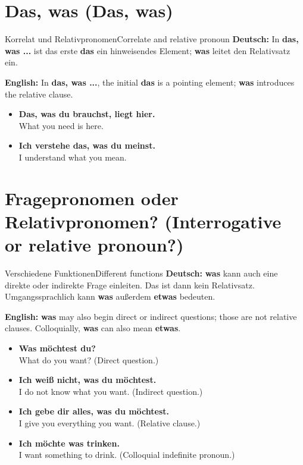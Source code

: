 \documentclass[a4paper,11pt]{article}
\newcommand{\GermanText}[1]{\textbf{Deutsch: }#1\par}
\newcommand{\EnglishText}[1]{{\small\color{SoftGray}\textbf{English: }#1\par}}
\newcommand{\ExampleItem}[2]{\item \textbf{#1}\\{\small\color{SoftGray}#2}}
\begin{document}
   \section{Das, was (Das, was)}
                           \begin{grammarentry}{Korrelat und Relativpronomen}{Correlate and relative pronoun}
                              \GermanText{In \textbf{das, was ...} ist das erste \textbf{das} ein hinweisendes Element; \textbf{was} leitet den Relativsatz ein.}
                              \EnglishText{In \textbf{das, was ...}, the initial \textbf{das} is a pointing element; \textbf{was} introduces the relative clause.}
                           \end{grammarentry}
                           \begin{exbox}\begin{itemize}
                              \ExampleItem{Das, was du brauchst, liegt hier.}{What you need is here.}
                              \ExampleItem{Ich verstehe das, was du meinst.}{I understand what you mean.}
                              \end{itemize}\end{exbox}
   \section{Fragepronomen oder Relativpronomen? (Interrogative or relative pronoun?)}
                              \begin{grammarentry}{Verschiedene Funktionen}{Different functions}
                                 \GermanText{\textbf{was} kann auch eine direkte oder indirekte Frage einleiten. Das ist dann kein Relativsatz. Umgangssprachlich kann \textbf{was} außerdem \textbf{etwas} bedeuten.}
                                 \EnglishText{\textbf{was} may also begin direct or indirect questions; those are not relative clauses. Colloquially, \textbf{was} can also mean \textbf{etwas}.}
                              \end{grammarentry}
                              \begin{exbox}\begin{itemize}
                                 \ExampleItem{Was möchtest du?}{What do you want? (Direct question.)}
                                 \ExampleItem{Ich weiß nicht, was du möchtest.}{I do not know what you want. (Indirect question.)}
                                 \ExampleItem{Ich gebe dir alles, was du möchtest.}{I give you everything you want. (Relative clause.)}
                                 \ExampleItem{Ich möchte was trinken.}{I want something to drink. (Colloquial indefinite pronoun.)}
                                 \end{itemize}\end{exbox}
\end{document}
